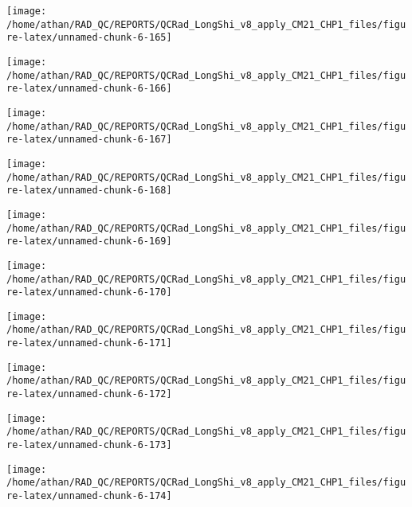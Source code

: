 \documentclass[
  10pt,
  a4paper,oneside]{article}
\begin{document}
\begin{center}\texttt{[image: /home/athan/RAD\_QC/REPORTS/QCRad\_LongShi\_v8\_apply\_CM21\_CHP1\_files/figure-latex/unnamed-chunk-6-165]} \end{center}

\begin{center}\texttt{[image: /home/athan/RAD\_QC/REPORTS/QCRad\_LongShi\_v8\_apply\_CM21\_CHP1\_files/figure-latex/unnamed-chunk-6-166]} \end{center}

\begin{center}\texttt{[image: /home/athan/RAD\_QC/REPORTS/QCRad\_LongShi\_v8\_apply\_CM21\_CHP1\_files/figure-latex/unnamed-chunk-6-167]} \end{center}

\begin{center}\texttt{[image: /home/athan/RAD\_QC/REPORTS/QCRad\_LongShi\_v8\_apply\_CM21\_CHP1\_files/figure-latex/unnamed-chunk-6-168]} \end{center}

\begin{center}\texttt{[image: /home/athan/RAD\_QC/REPORTS/QCRad\_LongShi\_v8\_apply\_CM21\_CHP1\_files/figure-latex/unnamed-chunk-6-169]} \end{center}

\begin{center}\texttt{[image: /home/athan/RAD\_QC/REPORTS/QCRad\_LongShi\_v8\_apply\_CM21\_CHP1\_files/figure-latex/unnamed-chunk-6-170]} \end{center}

\begin{center}\texttt{[image: /home/athan/RAD\_QC/REPORTS/QCRad\_LongShi\_v8\_apply\_CM21\_CHP1\_files/figure-latex/unnamed-chunk-6-171]} \end{center}

\begin{center}\texttt{[image: /home/athan/RAD\_QC/REPORTS/QCRad\_LongShi\_v8\_apply\_CM21\_CHP1\_files/figure-latex/unnamed-chunk-6-172]} \end{center}

\begin{center}\texttt{[image: /home/athan/RAD\_QC/REPORTS/QCRad\_LongShi\_v8\_apply\_CM21\_CHP1\_files/figure-latex/unnamed-chunk-6-173]} \end{center}

\begin{center}\texttt{[image: /home/athan/RAD\_QC/REPORTS/QCRad\_LongShi\_v8\_apply\_CM21\_CHP1\_files/figure-latex/unnamed-chunk-6-174]} \end{center}
\end{document}
